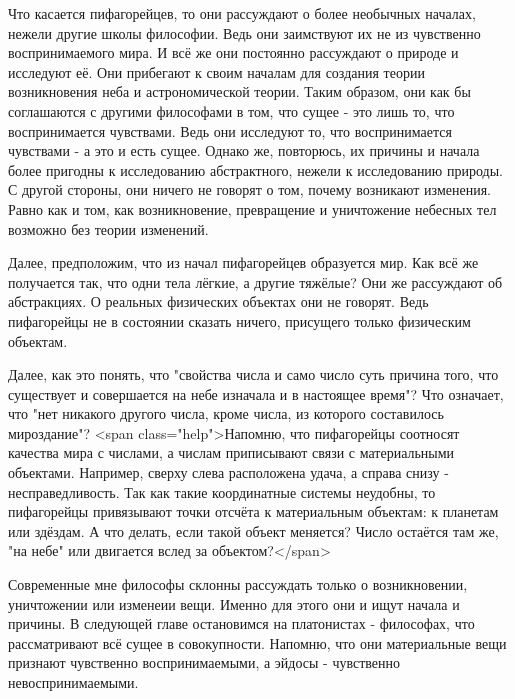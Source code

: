 \documentclass{article}
\begin{document}
Что касается пифагорейцев, то они рассуждают о более необычных началах, нежели другие школы философии. Ведь они заимствуют их не из чувственно воспринимаемого мира. И всё же они постоянно рассуждают о природе и исследуют её. Они прибегают к своим началам для создания теории возникновения неба и астрономической теории. Таким образом, они как бы соглашаются с другими философами в том, что сущее - это лишь то, что воспринимается чувствами. Ведь они исследуют то, что воспринимается чувствами - а это и есть сущее. Однако же, повторюсь, их причины и начала более пригодны к исследованию абстрактного, нежели к исследованию природы. С другой стороны, они ничего не говорят о том, почему возникают изменения. Равно как и том, как возникновение, превращение и уничтожение небесных тел возможно без теории изменений.

Далее, предположим, что из начал пифагорейцев образуется мир. Как всё же получается так, что одни тела лёгкие, а другие тяжёлые? Они же рассуждают об абстракциях. О реальных физических объектах они не говорят. Ведь пифагорейцы не в состоянии сказать ничего, присущего только физическим объектам.

Далее, как это понять, что "свойства числа и само число суть причина того, что существует и совершается на небе изначала и в настоящее время"? Что означает, что "нет никакого другого числа, кроме числа, из которого составилось мироздание"? <span class="help">Напомню, что пифагорейцы соотносят качества мира с числами, а числам приписывают связи с материальными объектами. Например, сверху слева расположена удача, а справа снизу - несправедливость. Так как такие координатные системы неудобны, то пифагорейцы привязывают точки отсчёта к материальным объектам: к планетам или здёздам. А что делать, если такой объект меняется? Число остаётся там же, "на небе" или двигается вслед за объектом?</span>

Современные мне философы склонны рассуждать только о возникновении, уничтожении или изменеии вещи. Именно для этого они и ищут начала и причины. В следующей главе остановимся на платонистах - философах, что рассматривают всё сущее в совокупности. Напомню, что они материальные вещи признают чувственно воспринимаемыми, а эйдосы - чувственно невоспринимаемыми.
\end{document}
